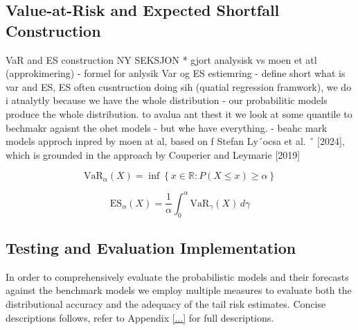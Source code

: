 

\subsection{Value-at-Risk and Expected Shortfall Construction}


VaR and ES construction NY SEKSJON
* gjort analysisk vs moen et atl (approkimering) - formel for anlysik Var og ES estiemring
- define short what is var and ES, ES often cusntruction doing sih (quatial regression framwork), we do i atnalytly because we have the whole distribution
- our probabilitic models produce the whole distribution. to avalua ant thest it we look at some quantile to bechmakr agaisnt the ohet models - but whe have everything. 
- beahc mark models approch inpred by moen at al, based on f Stefan Ly´ocsa et al. ˇ [2024], which is grounded in the approach by Couperier and Leymarie [2019]

\begin{equation}
    \text{VaR}_\alpha(X) = \inf \left\{ x \in \mathbb{R} : P(X \leq x) \geq \alpha \right\}
\end{equation}

\begin{equation}
    \text{ES}_{\alpha}(X) = \frac{1}{\alpha} \int_0^{\alpha} \text{VaR}_{\gamma}(X) \, d\gamma
\end{equation}

\subsection{Testing and Evaluation Implementation}
\label{sec:testing_and_evaluation_implementation}
In order to comprehensively evaluate the probabilistic models and their forecasts against the benchmark models we employ multiple measures to evaluate both the distributional accuracy and the adequacy of the tail risk estimates. Concise descriptions follows, refer to Appendix \ref{...} for full descriptions. 

